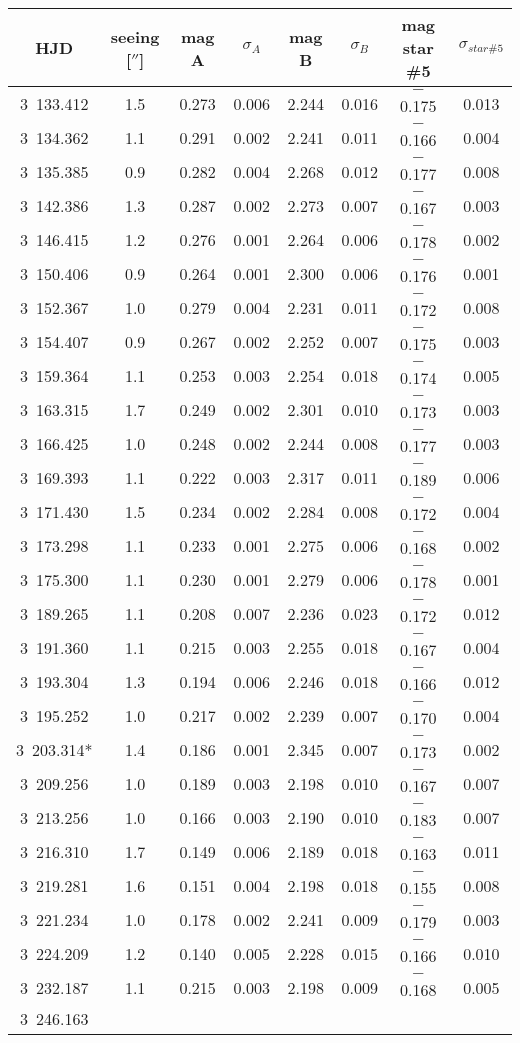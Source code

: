 \begin{table}[H]%
\newcommand{\obj}{SDSS1650}
\centering \small 
\begin{tabular}{cccccccc} 
\hline\hline HJD & seeing [$''$] & mag A & $\sigma_A$ & mag B & $\sigma_B$ & mag star \#5 & $\sigma_{star \#5}$ \\ \hline 3~133.412 & 1.5 & 0.273 & 0.006 & 2.244 & 0.016 & $-$0.175 & 0.013 \\ 3~134.362 & 1.1 & 0.291 & 0.002 & 2.241 & 0.011 & $-$0.166 & 0.004 \\ 3~135.385 & 0.9 & 0.282 & 0.004 & 2.268 & 0.012 & $-$0.177 & 0.008 \\ 3~142.386 & 1.3 & 0.287 & 0.002 & 2.273 & 0.007 & $-$0.167 & 0.003 \\ 3~146.415 & 1.2 & 0.276 & 0.001 & 2.264 & 0.006 & $-$0.178 & 0.002 \\ 3~150.406 & 0.9 & 0.264 & 0.001 & 2.300 & 0.006 & $-$0.176 & 0.001 \\ 3~152.367 & 1.0 & 0.279 & 0.004 & 2.231 & 0.011 & $-$0.172 & 0.008 \\ 3~154.407 & 0.9 & 0.267 & 0.002 & 2.252 & 0.007 & $-$0.175 & 0.003 \\ 3~159.364 & 1.1 & 0.253 & 0.003 & 2.254 & 0.018 & $-$0.174 & 0.005 \\ 3~163.315 & 1.7 & 0.249 & 0.002 & 2.301 & 0.010 & $-$0.173 & 0.003 \\ 3~166.425 & 1.0 & 0.248 & 0.002 & 2.244 & 0.008 & $-$0.177 & 0.003 \\ 3~169.393 & 1.1 & 0.222 & 0.003 & 2.317 & 0.011 & $-$0.189 & 0.006 \\ 3~171.430 & 1.5 & 0.234 & 0.002 & 2.284 & 0.008 & $-$0.172 & 0.004 \\ 3~173.298 & 1.1 & 0.233 & 0.001 & 2.275 & 0.006 & $-$0.168 & 0.002 \\ 3~175.300 & 1.1 & 0.230 & 0.001 & 2.279 & 0.006 & $-$0.178 & 0.001 \\ 3~189.265 & 1.1 & 0.208 & 0.007 & 2.236 & 0.023 & $-$0.172 & 0.012 \\ 3~191.360 & 1.1 & 0.215 & 0.003 & 2.255 & 0.018 & $-$0.167 & 0.004 \\ 3~193.304 & 1.3 & 0.194 & 0.006 & 2.246 & 0.018 & $-$0.166 & 0.012 \\ 3~195.252 & 1.0 & 0.217 & 0.002 & 2.239 & 0.007 & $-$0.170 & 0.004 \\ 3~203.314* & 1.4 & 0.186 & 0.001 & 2.345 & 0.007 & $-$0.173 & 0.002 \\ 3~209.256 & 1.0 & 0.189 & 0.003 & 2.198 & 0.010 & $-$0.167 & 0.007 \\ 3~213.256 & 1.0 & 0.166 & 0.003 & 2.190 & 0.010 & $-$0.183 & 0.007 \\ 3~216.310 & 1.7 & 0.149 & 0.006 & 2.189 & 0.018 & $-$0.163 & 0.011 \\ 3~219.281 & 1.6 & 0.151 & 0.004 & 2.198 & 0.018 & $-$0.155 & 0.008 \\ 3~221.234 & 1.0 & 0.178 & 0.002 & 2.241 & 0.009 & $-$0.179 & 0.003 \\ 3~224.209 & 1.2 & 0.140 & 0.005 & 2.228 & 0.015 & $-$0.166 & 0.010 \\ 3~232.187 & 1.1 & 0.215 & 0.003 & 2.198 & 0.009 & $-$0.168 & 0.005 \\ 3~246.163 & 
\end{tabular}
\end{table}
